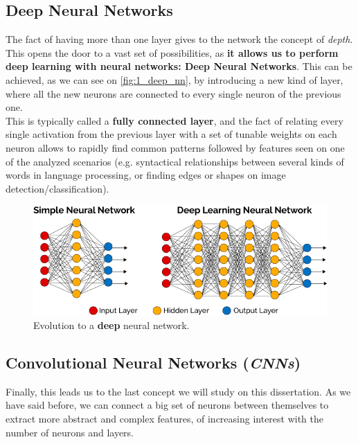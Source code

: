\subsection{Deep Neural Networks}
The fact of having more than one layer gives to the network the concept of \emph{depth}. This opens the door to a vast set of possibilities, as \textbf{it allows us to perform deep learning with neural networks: Deep Neural Networks}. This can be achieved, as we can see on \autoref{fig:1_deep_nn}, by introducing a new kind of layer, where all the new neurons are connected to every single neuron of the previous one.\\
This is typically called a \textbf{fully connected layer}, and the fact of relating every single activation from the previous layer with a set of tunable weights on each neuron allows to rapidly find common patterns followed by features seen on one of the analyzed scenarios (e.g. syntactical relationships between several kinds of words in language processing, or finding edges or shapes on image detection/classification).

\begin{figure}[h]
	\centering
	\includegraphics[width=0.9\linewidth]{images/deep_neural_network}
	\caption{Evolution to a \textbf{deep} neural network.}
	\label{fig:1_deep_nn}
\end{figure}

\subsection{Convolutional Neural Networks (\emph{CNNs})}

Finally, this leads us to the last concept we will study on this dissertation. As we have said before, we can connect a big set of neurons between themselves to extract more abstract and complex features, of increasing interest with the number of neurons and layers.\\
 

